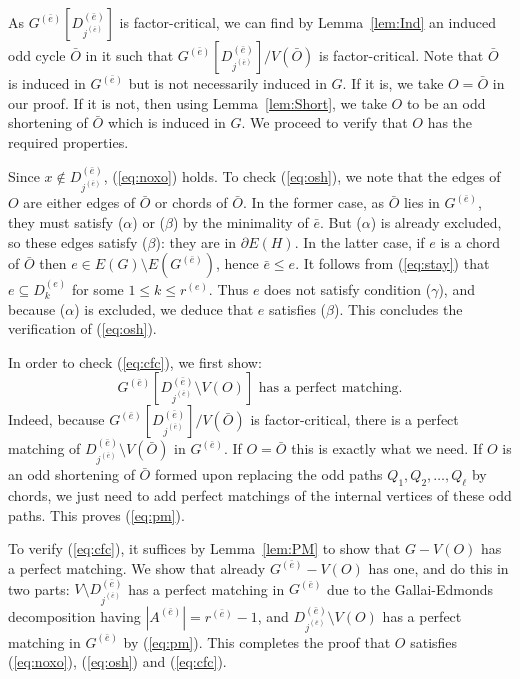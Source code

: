 \documentclass{article}
\theoremstyle{definition}
\begin{document}
As $G^{(\bar{e})}[D_{j^{(\bar{e})}}^{(\bar{e})}]$ is factor-critical, we can find by Lemma~\ref{lem:Ind} an induced odd cycle $\bar{O}$ in it such that $G^{(\bar{e})}[D_{j^{(\bar{e})}}^{(\bar{e})}]/V(\bar{O})$ is factor-critical. Note that $\bar{O}$ is induced in $G^{(\bar{e})}$ but is not necessarily induced in $G$. If it is, we take $O = \bar{O}$ in our proof. If it is not, then using Lemma~\ref{lem:Short}, we take $O$ to be an odd shortening of $\bar{O}$ which is induced in $G$. We proceed to verify that $O$ has the required properties.

Since $x \notin D_{j^{(\bar{e})}}^{(\bar{e})}$, (\ref{eq:noxo}) holds. To check (\ref{eq:osh}), we note that the edges of $O$ are either edges of $\bar{O}$ or chords of $\bar{O}$. In the former case, as $\bar{O}$ lies in $G^{(\bar{e})}$, they must satisfy ($\alpha$) or ($\beta$) by the minimality of $\bar{e}$. But ($\alpha$) is already excluded, so these edges satisfy ($\beta$): they are in $\partial E(H)$. In the latter case, if $e$ is a chord of $\bar{O}$ then $e \in E(G) \setminus E(G^{(\bar{e})})$, hence $\bar{e} \le e$. It follows from (\ref{eq:stay}) that $e \subseteq D_k^{(e)}$ for some $1 \le k \le r^{(e)}$. Thus $e$ does not satisfy condition ($\gamma$), and because ($\alpha$) is excluded, we deduce that $e$ satisfies ($\beta$). This concludes the verification of (\ref{eq:osh}).

In order to check (\ref{eq:cfc}), we first show:
\begin{equation} \label{eq:pm}
G^{(\bar{e})}[D_{j^{(\bar{e})}}^{(\bar{e})} \setminus V(O)] \textrm{ has a perfect matching}.
\end{equation}
Indeed, because $G^{(\bar{e})}[D_{j^{(\bar{e})}}^{(\bar{e})}]/V(\bar{O})$ is factor-critical, there is a perfect matching of $D_{j^{(\bar{e})}}^{(\bar{e})} \setminus V(\bar{O})$ in $G^{(\bar{e})}$. If $O = \bar{O}$ this is exactly what we need. If $O$ is an odd shortening of $\bar{O}$ formed upon replacing the odd paths $Q_1, Q_2, \ldots , Q_{\ell}$ by chords, we just need to add perfect matchings of the internal vertices of these odd paths. This proves (\ref{eq:pm}).

To verify (\ref{eq:cfc}), it suffices by Lemma~\ref{lem:PM} to show that $G - V(O)$ has a perfect matching. We show that already $G^{(\bar{e})} - V(O)$ has one, and do this in two parts: $V \setminus D_{j^{(\bar{e})}}^{(\bar{e})}$ has a perfect matching in $G^{(\bar{e})}$ due to the Gallai-Edmonds decomposition having $|A^{(\bar{e})}| = r^{(\bar{e})} - 1$, and $D_{j^{(\bar{e})}}^{(\bar{e})} \setminus V(O)$ has a perfect matching in $G^{(\bar{e})}$ by (\ref{eq:pm}). This completes the proof that $O$ satisfies (\ref{eq:noxo}), (\ref{eq:osh}) and (\ref{eq:cfc}).
\end{document}
